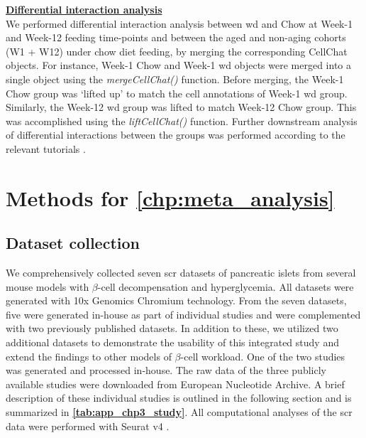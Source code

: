 
\underline{\normalsize \textbf{Differential interaction analysis}}\\

We performed differential interaction analysis between \gls{wd} and Chow at Week-1 and Week-12 feeding time-points and between the aged and non-aging cohorts (W1 + W12) under chow diet feeding, by merging the corresponding CellChat objects. For instance, Week-1 Chow and Week-1 \gls{wd} objects were merged into a single object using the \textit{mergeCellChat()} function. Before merging, the Week-1 Chow group was ‘lifted up’ to match the cell annotations of Week-1 \gls{wd} group. Similarly, the Week-12 \gls{wd} group was lifted to match Week-12 Chow group. This was accomplished using the \textit{liftCellChat()} function. Further downstream analysis of differential interactions between the groups was performed according to the relevant tutorials \textbf{\cite{jin_comparison_nodate-1,jin_comparison_nodate}}.



\section{Methods for \autoref{chp:meta_analysis}}
\label{sec:chp3_methods}

\subsection[Dataset collection]{Dataset collection}
\label{subsubsec:met_chp3_data}

We comprehensively collected seven \gls{scr} datasets of pancreatic islets from several mouse models with $\beta$-cell decompensation and hyperglycemia. All datasets were generated with 10x Genomics Chromium technology. From the seven datasets, five were generated in-house as part of individual studies and were complemented with two previously published datasets. In addition to these, we utilized two additional datasets to demonstrate the usability of this integrated study and extend the findings to other models of $\beta$-cell workload. One of the two studies was generated and processed in-house. The raw data of the three publicly available studies were downloaded from European Nucleotide Archive. A brief description of these individual studies is outlined in the following section and is summarized in \textbf{\autoref{tab:app_chp3_study}}. All computational analyses of the \gls{scr} data were performed with Seurat v4 \textbf{\cite{hao_integrated_2021}}.\\

